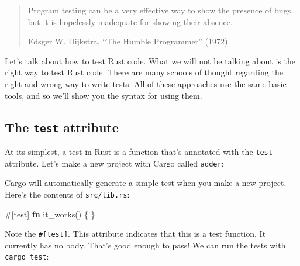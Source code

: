 \documentclass[a4paper,]{book}
\newenvironment{Shaded}{\begin{snugshade}}{\end{snugshade}}
\newcommand{\KeywordTok}[1]{\textcolor[rgb]{0.13,0.29,0.53}{\textbf{{#1}}}}
\newcommand{\AttributeTok}[1]{\textcolor[rgb]{0.77,0.63,0.00}{{#1}}}
\newcommand{\NormalTok}[1]{{#1}}
\begin{document}
\begin{quote}
Program testing can be a very effective way to show the presence of
bugs, but it is hopelessly inadequate for showing their absence.

Edsger W. Dijkstra, ``The Humble Programmer'' (1972)
\end{quote}

Let's talk about how to test Rust code. What we will not be talking
about is the right way to test Rust code. There are many schools of
thought regarding the right and wrong way to write tests. All of these
approaches use the same basic tools, and so we'll show you the syntax
for using them.

\subsection{\texorpdfstring{The \texttt{test}
attribute}{The test attribute}}\label{the-test-attribute}

At its simplest, a test in Rust is a function that's annotated with the
\texttt{test} attribute. Let's make a new project with Cargo called
\texttt{adder}:

\begin{Shaded}
\end{Shaded}

Cargo will automatically generate a simple test when you make a new
project. Here's the contents of \texttt{src/lib.rs}:

\begin{Shaded}
\begin{Highlighting}[]
\AttributeTok{#[}\NormalTok{test}\AttributeTok{]}
\KeywordTok{fn} \NormalTok{it_works() \{}
\NormalTok{\}}
\end{Highlighting}
\end{Shaded}

Note the \texttt{\#{[}test{]}}. This attribute indicates that this is a
test function. It currently has no body. That's good enough to pass! We
can run the tests with \texttt{cargo\ test}:
\end{document}
